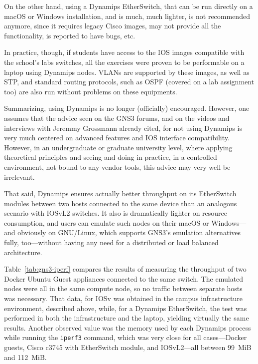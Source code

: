 On the other hand, using a Dynamips EtherSwitch, that can be run directly on a macOS or Windows installation, and is much, much lighter, is not recommended anymore, since it requires legacy Cisco images, may not provide all the functionality, is reported to have bugs, etc.

In practice, though, if students have access to the IOS images compatible with the school's labs switches, all the exercises were proven to be performable on a laptop using Dynamips nodes.
VLANs are supported by these images, as well as STP, and standard routing protocols, such as OSPF (covered on a lab assignment too) are also run without problems on these equipments.

Summarizing, using Dynamips is no longer (officially) encouraged.
However, one assumes that the advice seen on the GNS3 forums, and on the videos and interviews with Jeremmy Grossmann already cited, for not using Dynamips is very much centered on advanced features and IOS interface compatibility.
However, in an undergraduate or graduate university level, where applying theoretical principles and seeing and doing in practice, in a controlled environment, not bound to any vendor tools, this advice may very well be irrelevant.



That said, Dynamips ensures actually better throughput on its EtherSwitch modules between two hosts connected to the same device than an analogous scenario with IOSvL2 switches.
It also is dramatically lighter on resource consumption, and users can emulate such nodes on their macOS or Windows---and obviously on GNU/Linux, which supports GNS3's emulation alternatives fully, too---without having any need for a distributed or load balanced architecture.

Table~\ref{tab:gns3-iperf} compares the results of measuring the throughput of two Docker Ubuntu Guest appliances connected to the same switch.
The emulated nodes were all in the same compute node, so no traffic between separate hosts was necessary.
That data, for IOSv was obtained in the campus infrastructure environment, described above, while, for a Dynamips EtherSwitch, the test was performed in both the infrastructure and the laptop, yielding virtually the same results.
Another observed value was the memory used by each Dynamips process while running the \texttt{iperf3} command, which was very close for all cases---Docker guests, Cisco c3745 with EtherSwitch module, and IOSvL2---all between 99~MiB and 112~MiB.

